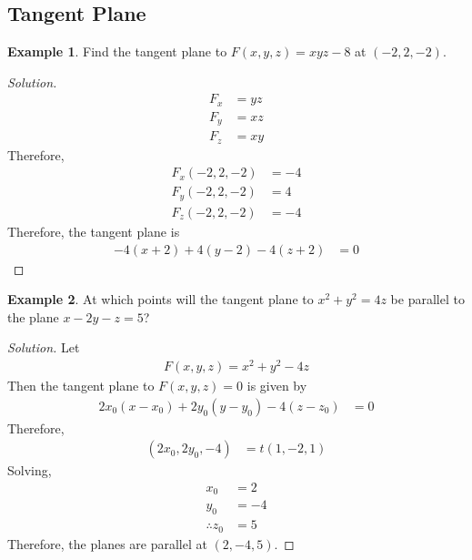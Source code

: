 \documentclass[fleqn, 12pt]{article}
\theoremstyle{definition}
\newtheorem{example}{Example}
\theoremstyle{theorem}
\newenvironment{solution}
{\begin{proof}[Solution]\let\qed\relax}
	{\end{proof}}
\begin{document}
\subsection{Tangent Plane}

\begin{example}
	Find the tangent plane to $F(x,y,z) = x y z - 8$ at $(-2, 2, -2)$.
\end{example}

\begin{solution}
	\begin{align*}
		F_x &= y z\\
		F_y &= x z\\
		F_z &= x y
	\end{align*}
	Therefore,
	\begin{align*}
		F_x(-2, 2, -2) &= -4\\
		F_y(-2, 2, -2) &= 4\\
		F_z(-2, 2, -2) &= -4
	\end{align*}
	Therefore, the tangent plane is
	\begin{align*}
		-4(x + 2) + 4(y - 2) - 4(z + 2) &= 0
	\end{align*}
\end{solution}

\begin{example}
	At which points will the tangent plane to $x^2 + y^2 = 4z$ be parallel to the plane $x - 2y - z = 5$?
\end{example}

\begin{solution}
	Let
	\begin{align*}
		F(x,y,z) = x^2 + y^2 - 4z
	\end{align*}
	Then the tangent plane to $F(x,y,z) = 0$ is given by
	\begin{align*}
		2x_0 (x - x_0) + 2y_0 (y - y_0) - 4 (z - z_0) &= 0
	\end{align*}
	Therefore,
	\begin{align*}
		(2 x_0, 2 y_0, -4) &= t (1, -2, 1)
	\end{align*}
	Solving,
	\begin{align*}
		x_0 &= 2\\
		y_0 &= -4\\
		\therefore z_0 &= 5
	\end{align*}
	Therefore, the planes are parallel at $(2, -4, 5)$.
\end{solution}
\end{document}
